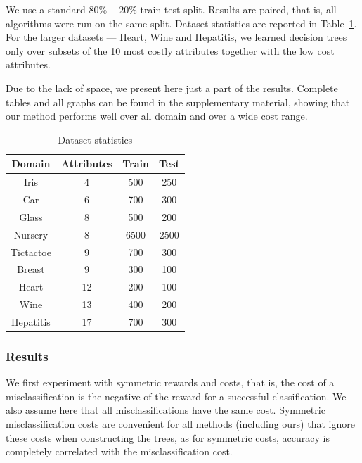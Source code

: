 \documentclass[letterpaper]{article}
\theoremstyle{definition}
\begin{document}
We use a standard $80\%-20\%$ train-test split. Results are paired, that is, all algorithms were run on the same split. Dataset statistics are reported in Table~\ref{tbl:datasets}. For the larger datasets --- Heart, Wine and Hepatitis, we learned decision trees only over subsets of the 10 most costly attributes together with the low cost attributes.

Due to the lack of space, we present here just a part of the results. Complete tables and all graphs can be found in the supplementary material, showing that our method performs well over all domain and over a wide cost range.

\begin{table}[ht]
\centering
\footnotesize
\begin{tabular}{|c|c|c|c|}
\hline
 	Domain & Attributes&	Train	&Test \\ \hline
Iris&	4&	500&	250\\
Car&	6	&700&	300\\
 	 	 	 
 	 	 	 
 	 	 	 
 	 	 	 
Glass&	8&	500	&200\\
 	 	 	 
 	 	 	 
 	 	 	 
 	 	 	 
Nursery&	8&	6500&	2500\\
 	 	 	 
Tictactoe&	9&	700&	300\\
Breast&	9&	300&	100\\
 	 	 	 
Heart&	12&	200	&100\\
Wine&	13&	400&	200\\ 
Hepatitis&	17&	700&	300\\\hline

\end{tabular}
\caption{Dataset statistics}
\label{tbl:datasets}
\end{table}

\subsubsection{Results}

We first experiment with symmetric rewards and costs, that is, the cost of a misclassification is the negative of the reward for a successful classification. We also assume here that all misclassifications have the same cost. 
Symmetric misclassification costs are convenient for all methods (including ours) that ignore these costs when constructing the trees, as for symmetric costs, accuracy is completely correlated with the misclassification cost.
\end{document}
